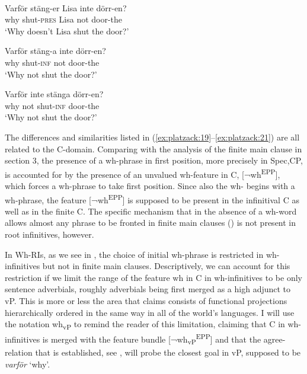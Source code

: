 \documentclass[output=paper]{LSP/langsci}
\begin{document}
\ea%
    \label{ex:platzack:21}
	    \\
   \ea
\gll Varför  stäng-er    Lisa  inte  dörr-en?\\
        why    shut-\textsc{pres}  Lisa   not  door-the\\
  \glt   ‘Why doesn’t Lisa shut the door?’

   \ex
\gll *Varför  stäng-a  inte  dörr-en?\\
          why    shut-\textsc{inf}  not  door-the\\
    \glt   ‘Why not shut the door?’

   \ex \label{ex:platzack:21c}
\gll Varför  inte  stänga  dörr-en?\\
        why    not  shut-\textsc{inf}  door-the\\
  \glt   ‘Why not shut the door?’
\z
\z

The differences and similarities listed in (\ref{ex:platzack:19}--\ref{ex:platzack:21}) are all related to the C-domain. Comparing with the analysis of the finite main clause in section 3, the presence of a wh-phrase in first position, more precisely in Spec,CP, is accounted for by the presence of an unvalued wh-feature in C, [¬wh\textsuperscript{EPP}], which forces a wh-phrase to take first position. Since also the wh- begins with a wh-phrase, the feature [¬wh\textsuperscript{EPP}] is supposed to be present in the infinitival C as well as in the finite C. The specific mechanism that in the absence of a wh-word allows almost any phrase to be fronted in  finite main clauses () is not present in  root infinitives, however. 

In Wh-RIs, as we see in , the choice of initial wh-phrase is restricted in wh-infinitives but not in finite main clauses. Descriptively, we can account for this restriction if we limit the range of the feature wh in C in wh-infinitives to be only sentence adverbials, roughly adverbials being first merged as a high adjunct to vP. This is more or less the area that \citet{Cinque1999} claims consists of functional projections hierarchically ordered in the same way in all of the world’s languages. I will use the notation wh\textsubscript{vP} to remind the reader of this limitation, claiming that C in wh-infinitives is merged with the feature bundle [¬wh\textsubscript{vP}\textsuperscript{EPP}] and that the agree-relation that is established, see , will probe the closest goal in vP, supposed to be \textit{varför} ‘why’.
\end{document}
